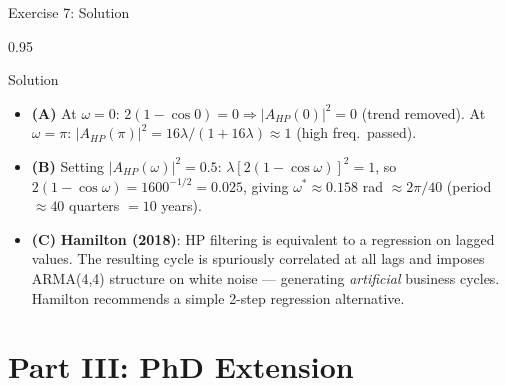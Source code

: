 \documentclass[9pt, aspectratio=169, t]{beamer}
\begin{document}
\begin{frame}{Exercise 7: Solution}
    \begin{cminipage}{0.95\textwidth}
    \begin{exampleblock}{Solution}
        {\footnotesize
        \begin{itemize}\setlength{\itemsep}{3pt}
            \item \textcolor{MainBlue}{\textbf{(A)}} At $\omega=0$: $2(1-\cos 0)=0 \Rightarrow |A_{HP}(0)|^2=0$ (trend removed).
                At $\omega=\pi$: $|A_{HP}(\pi)|^2 = 16\lambda/(1+16\lambda)\approx 1$ (high freq.\ passed).
            \item \textcolor{MainBlue}{\textbf{(B)}} Setting $|A_{HP}(\omega)|^2=0.5$: $\lambda[2(1-\cos\omega)]^2=1$, so
                $2(1-\cos\omega)=1600^{-1/2}=0.025$, giving $\omega^*\approx 0.158$ rad $\approx 2\pi/40$ (period $\approx 40$ quarters $= 10$ years).
            \item \textcolor{MainBlue}{\textbf{(C)}} \textbf{Hamilton (2018)}: HP filtering is equivalent to a regression on lagged values. The resulting cycle is spuriously correlated at all lags and imposes ARMA(4,4) structure on white noise --- generating \emph{artificial} business cycles. Hamilton recommends a simple 2-step regression alternative.
        \end{itemize}
        }
    \end{exampleblock}
    \end{cminipage}
\end{frame}

\section{Part III: PhD Extension}
\end{document}
